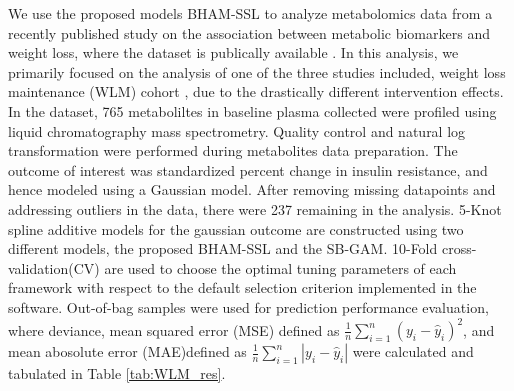 \documentclass[AMA,STIX1COL,]{WileyNJD-v2}
\begin{document}
We use the proposed models BHAM-SSL to analyze metabolomics data from a
recently published study \citep{Bihlmeyer2021} on the association
between metabolic biomarkers and weight loss, where the dataset is
publically available \citep{Bihlmeyer2021_data}. In this analysis, we
primarily focused on the analysis of one of the three studies included,
weight loss maintenance (WLM) cohort \citep{Svetkey2008}, due to the
drastically different intervention effects. In the dataset, 765
metaboliltes in baseline plasma collected were profiled using liquid
chromatography mass spectrometry. Quality control and natural log
transformation were performed during metabolites data preparation. The
outcome of interest was standardized percent change in insulin
resistance, and hence modeled using a Gaussian model. After removing
missing datapoints and addressing outliers in the data, there were 237
remaining in the analysis. 5-Knot spline additive models for the
gaussian outcome are constructed using two different models, the
proposed BHAM-SSL and the SB-GAM. 10-Fold cross-validation(CV) are used
to choose the optimal tuning parameters of each framework with respect
to the default selection criterion implemented in the software.
Out-of-bag samples were used for prediction performance evaluation,
where deviance, mean squared error (MSE) defined as
\(\frac{1}{n}\sum\limits^{n}_{i=1}(y_i - \hat y_i)^2\), and mean
abosolute error (MAE)defined as
\(\frac{1}{n}\sum\limits^{n}_{i=1}|y_i - \hat y_i|\) were calculated and
tabulated in Table \ref{tab:WLM_res}.

\providecommand{\docline}[3]{\noalign{\global\setlength{\arrayrulewidth}{#1}}\arrayrulecolor[HTML]{#2}\cline{#3}}

\setlength{\tabcolsep}{2pt}

\renewcommand*{\arraystretch}{1.5}
\end{document}
